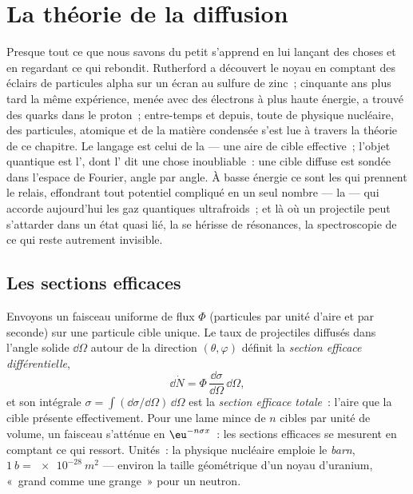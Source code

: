 \chapter{La théorie de la diffusion}\label{ch:b3:scattering-theory}

Presque tout ce que nous savons du petit s'apprend en lui lançant des
choses et en regardant ce qui rebondit. Rutherford a découvert le
noyau en comptant des éclairs de particules alpha sur un écran au
sulfure de zinc~; cinquante ans plus tard la même expérience, menée
avec des électrons à plus haute énergie, a trouvé des quarks dans le
proton~; entre-temps et depuis, toute  de physique
nucléaire, des particules, atomique et de la matière condensée s'est
lue à travers la théorie de ce chapitre. Le langage est celui de la
\emph{} --- une aire de cible effective~; l'objet
quantique est l'\emph{}, dont l' dit une chose inoubliable~: une cible diffuse est sondée dans
l'espace de Fourier, angle par angle. À basse énergie ce sont les
 qui prennent le relais, effondrant tout potentiel
compliqué en un seul nombre --- la  --- qui
accorde aujourd'hui les gaz quantiques ultrafroids~; et là où un
projectile peut s'attarder dans un état quasi lié, la 
se hérisse de résonances, la spectroscopie de ce qui reste autrement
invisible.

\section{Les sections efficaces}

\begin{definition}\label{def:b3:scattering-theory:cross-section}
Envoyons un faisceau uniforme de flux $\Phi$ (particules par unité
d'aire et par seconde) sur une particule cible unique. Le taux de
projectiles diffusés dans l'angle solide $\dd\Omega$ autour de la
direction $(\theta,
\varphi)$ définit la \emph{section efficace différentielle},
\[
\dd\dot N = \Phi\,\frac{\dd\sigma}{\dd\Omega}\,\dd\Omega ,
\]
et son intégrale $\sigma = \int(\dd\sigma/\dd\Omega)\,\dd\Omega$ est
la \emph{section efficace totale}~: l'aire que la cible présente
effectivement. Pour une lame mince de $n$ cibles par unité de volume,
un faisceau s'atténue en $\eu^{-n\sigma x}$~: les sections efficaces
se mesurent en comptant ce qui ressort. Unités~: la physique nucléaire
emploie le \emph{barn}, $\qty{1}{b} = \qty{e-28}{m^2}$ --- environ la
taille géométrique d'un noyau d'uranium, «~grand comme une grange~»
pour un neutron.
\end{definition}

